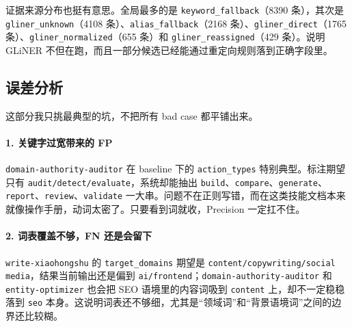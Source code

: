 证据来源分布也挺有意思。全局最多的是 \texttt{keyword\_fallback}（8390 条），其次是 \texttt{gliner\_unknown}（4108 条）、\texttt{alias\_fallback}（2168 条）、\texttt{gliner\_direct}（1765 条）、\texttt{gliner\_normalized}（655 条）和 \texttt{gliner\_reassigned}（429 条）。说明 GLiNER 不但在跑，而且一部分候选已经能通过重定向规则落到正确字段里。

\subsection{误差分析}
这部分我只挑最典型的坑，不把所有 bad case 都平铺出来。

\paragraph{1. 关键字过宽带来的 FP}
\texttt{domain-authority-auditor} 在 baseline 下的 \texttt{action\_types} 特别典型。标注期望只有 \texttt{audit/detect/evaluate}，系统却能抽出 \texttt{build}、\texttt{compare}、\texttt{generate}、\texttt{report}、\texttt{review}、\texttt{validate} 一大串。问题不在正则写错，而在这类技能文档本来就像操作手册，动词太密了。只要看到词就收，Precision 一定扛不住。

\paragraph{2. 词表覆盖不够，FN 还是会留下}
\texttt{write-xiaohongshu} 的 \texttt{target\_domains} 期望是 \texttt{content/copywriting/social media}，结果当前输出还是偏到 \texttt{ai/frontend}；\texttt{domain-authority-auditor} 和 \texttt{entity-optimizer} 也会把 SEO 语境里的内容词吸到 \texttt{content} 上，却不一定稳稳落到 \texttt{seo} 本身。这说明词表还不够细，尤其是“领域词”和“背景语境词”之间的边界还比较糊。

